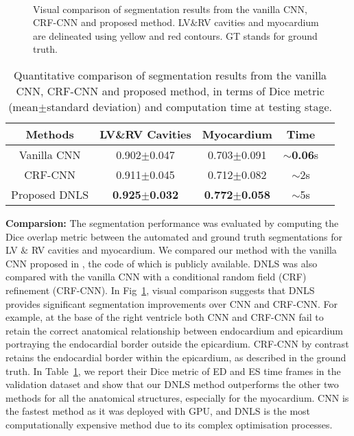 \documentclass[runningheads,a4paper]{llncs}
\begin{document}
\begin{figure}[h!] 
\vspace{-20pt}
\\
\vspace{-5pt}
\caption{Visual comparison of segmentation results from the vanilla CNN, CRF-CNN and proposed method. LV$\&$RV cavities and myocardium are delineated using yellow and red contours. GT stands for ground truth.}
\label{fig:visual}
\vspace{-25pt}
\end{figure}\begin{table}[h!]
\vspace{-25pt}
\centering
\caption{Quantitative comparison of segmentation results from the vanilla CNN, CRF-CNN and proposed method, in terms of Dice metric (mean$\pm$standard deviation) and computation time at testing stage.}
\begin{tabular}{ccccc} \toprule{Methods} & {LV\&RV Cavities}     & {Myocardium} & {Time} \\ \midrule
Vanilla CNN \cite{bai2017human}            & 0.902$\pm$0.047          & 0.703$\pm$0.091           & $\sim$\textbf{0.06}s  \\
CRF-CNN     \cite{krahenbuhl2011efficient} & 0.911$\pm$0.045          & 0.712$\pm$0.082           & $\sim$2s  \\
Proposed DNLS                              &\textbf{0.925$\pm$0.032} & \textbf{0.772$\pm$0.058}  & $\sim$5s  \\ \midrule
\end{tabular}
\label{tb:numb}
\vspace{-15pt}
\end{table}\textbf{Comparsion:} The segmentation performance was evaluated by computing the Dice overlap metric between the automated and ground truth segmentations for LV $\&$ RV cavities and myocardium. We compared our method with the vanilla CNN proposed in \cite{bai2017human}, the code of which is publicly available. DNLS was also compared with the vanilla CNN with a conditional random field (CRF) \cite{krahenbuhl2011efficient} refinement (CRF-CNN). In Fig~\ref{fig:visual}, visual comparison suggests that DNLS provides significant segmentation improvements over CNN and CRF-CNN. For example, at the base of the right ventricle both CNN and CRF-CNN fail to retain the correct anatomical relationship between endocardium and epicardium portraying the endocardial border outside the epicardium. CRF-CNN by contrast retains the endocardial border within the epicardium, as described in the ground truth. In Table~\ref{tb:numb}, we report their Dice metric of ED and ES time frames in the validation dataset and show that our DNLS method outperforms the other two methods for all the anatomical structures, especially for the myocardium. CNN is the fastest method as it was deployed with GPU, and DNLS is the most computationally expensive method due to its complex optimisation processes. 
\end{document}
